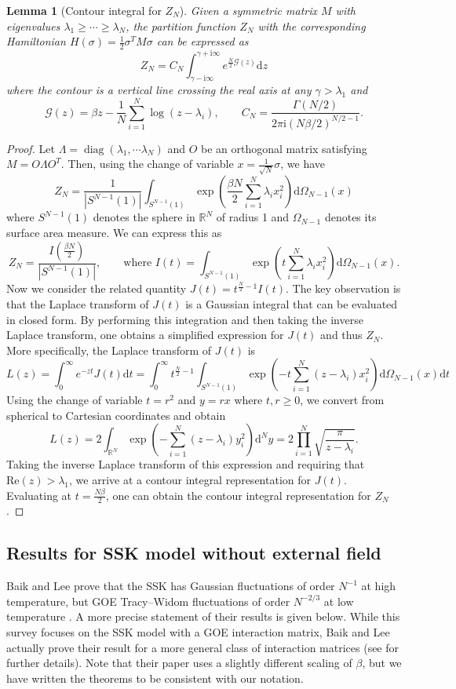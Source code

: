 \documentclass[11pt]{article}
\numberwithin{equation}{section}
\DeclareMathOperator*{\diag}{diag}
\newcommand{\beq}{ \begin{equation} }
\newcommand{\eeq}{ \end{equation} }
\def \dd {\mathrm{d}}
\def \b {\beta}
\def \g {\gamma}
\def \la {\lambda}
\def \s {\sigma}
\def \RR {\mathbb{R}}
\def \cG {\mathcal{G}}
\newcommand{\ii}{\mathrm{i}}
\newtheorem{lemma}[theorem]{Lemma}
\theoremstyle{remark}
\begin{document}
\begin{lemma}[Contour integral for $Z_N$]\label{lem:contourintegral} Given a symmetric matrix $M$ with eigenvalues $\la_1\geq\cdots\geq\la_N$, the partition function $Z_N$ with the corresponding Hamiltonian $H(\s) =\frac12\s^TM\s$ can be expressed as
\beq
Z_N=C_N\int_{\g-\ii\infty}^{\g+\ii\infty}e^{\frac{N}{2}\cG(z)}\dd z
\eeq
where the contour is a vertical line crossing the real axis at any $\g>\la_1$ and
\beq
\cG(z)=\b z-\frac1N\sum_{i=1}^N\log(z-\la_i),\qquad C_N=\frac{\Gamma(N/2)}{2\pi\ii(N\b/2)^{N/2-1}}.
\eeq
\end{lemma}
\begin{proof}
Let $\Lambda=\diag(\la_1,\cdots\la_N)$ and $O$ be an orthogonal matrix satisfying $M=O\Lambda O^T$.  Then, using the change of variable $x=\frac{1}{\sqrt{N}}\sigma$, we have
\beq
Z_N=\frac{1}{|S^{N-1}(1)|}\int_{S^{N-1}(1)}\exp\left(\frac{\b N}{2}\sum_{i=1}^N\la_i x_i^2\right)\dd\Omega_{N-1}(x)
\eeq
where $S^{N-1}(1)$ denotes the sphere in $\RR^N$ of radius 1 and $\Omega_{N-1}$ denotes its surface area measure.  We can express this as
\beq
Z_N=\frac{I(\frac{\b N}{2})}{|S^{N-1}(1)|},\qquad\text{where }I(t)=\int_{S^{N-1}(1)}\exp\left(t\sum_{i=1}^N\la_i x_i^2\right)\dd\Omega_{N-1}(x).
\eeq
Now we consider the related quantity $J(t)=t^{\frac{N}{2}-1}I(t)$.  The key observation is that the Laplace transform of $J(t)$ is a Gaussian integral that can be evaluated in closed form.  By performing this integration and then taking the inverse Laplace transform, one obtains a simplified expression for $J(t)$ and thus $Z_N$.  More specifically, the Laplace transform of $J(t)$ is
\beq
L(z)=\int_0^\infty e^{-zt}J(t)\dd t=\int_0^\infty t^{\frac{N}{2}-1}\int_{S^{N-1}(1)}\exp\left(-t\sum_{i=1}^N(z-\la_i)x_i^2\right)\dd\Omega_{N-1}(x)\dd t
\eeq
Using the change of variable $t=r^2$ and $y=rx$ where $t,r\geq 0$, we convert from spherical to Cartesian coordinates and obtain
\beq
L(z)=2\int_{\RR^N}\exp\left(-\sum_{i=1}^N(z-\la_i)y_i^2\right)\dd^Ny=2\prod_{i=1}^N\sqrt{\frac{\pi}{z-\la_i}}.
\eeq
Taking the inverse Laplace transform of this expression and requiring that $\mathrm{Re} (z) >\la_1$, we arrive at a contour integral representation for $J(t)$.  Evaluating at $t=\frac{N\b}{2}$, one can obtain the contour integral representation for $Z_N$.
\end{proof}

\subsection{Results for SSK model without external field}
Baik and Lee prove that the SSK has Gaussian fluctuations of order $N^{-1}$ at high temperature, but GOE Tracy--Widom fluctuations of order $N^{-2/3}$ at low temperature \cite{BL16}.  A more precise statement of their results is given below.  While this survey focuses on the SSK model with a GOE interaction matrix, Baik and Lee actually prove their result for a more general class of interaction matrices (see \cite{BL16} for further details).  Note that their paper uses a slightly different scaling of $\b$, but we have written the theorems to be consistent with our notation.
\end{document}
